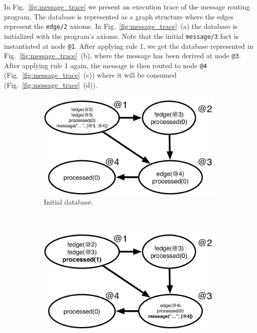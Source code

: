 In Fig.~\ref{fig:message_trace} we present an execution trace of the message
routing program.  The database is represented as a graph structure where the
edges represent the \texttt{edge/2} axioms. In Fig.~\ref{fig:message_trace}~(a)
the database is initialized with the program's axioms.  Note that the initial
\texttt{message/3} fact is instantiated at node \texttt{@1}. After applying rule 1,
we get the database represented in Fig.~\ref{fig:message_trace}~(b), where
the message has been derived at node \texttt{@3}. After applying rule 1
again, the message is then routed to node \texttt{@4}
(Fig.~\ref{fig:message_trace}~(c)) where it will be consumed
(Fig.~\ref{fig:message_trace}~(d)).

\begin{figure}[h]
        \centering
        \begin{subfigure}[b]{0.5\textwidth}
                \includegraphics[width=\textwidth]{figures/message/message_trace1}
                \caption{Initial database.}
                \label{fig:message_trace1}
        \end{subfigure}%
        ~
        \begin{subfigure}[b]{0.5\textwidth}
                \includegraphics[width=\textwidth]{figures/message/message_trace2}

\end{subfigure}
\end{figure}
